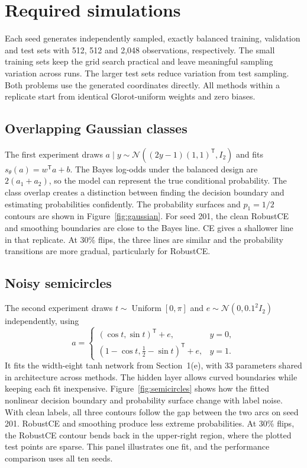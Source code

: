 \documentclass[11pt,a4paper]{article}
\begin{document}
\section{Required simulations}
\label{sec:simulations}
Each seed generates independently sampled, exactly balanced training,
validation and test sets with 512, 512 and 2,048 observations, respectively.
The small training sets keep the grid search practical and leave meaningful
sampling variation across runs. The larger test sets reduce variation from
test sampling. Both problems use the generated coordinates directly. All
methods within a replicate start from identical Glorot-uniform weights and
zero biases.

\subsection{Overlapping Gaussian classes}
The first experiment draws
$a\mid y\sim\mathcal N((2y-1)(1,1)^{\mathsf T},I_2)$ and fits
$s_\theta(a)=w^{\mathsf T}a+b$. The Bayes log-odds under the balanced design
are $2(a_1+a_2)$, so the model can represent the true conditional
probability. The class overlap creates a distinction between finding the
decision boundary and estimating probabilities confidently. The probability
surfaces and $p_1=1/2$ contours are shown in Figure~\ref{fig:gaussian}.
For seed 201, the clean RobustCE and smoothing boundaries are close to
the Bayes line. CE gives a shallower line in that replicate. At 30\%
flips, the three lines are similar and the probability transitions are
more gradual, particularly for RobustCE.

\subsection{Noisy semicircles}
The second experiment draws $t\sim\operatorname{Uniform}[0,\pi]$ and
$e\sim\mathcal N(0,0.1^2I_2)$ independently, using
\begin{equation}
    a=\begin{cases}
        (\cos t,\sin t)^{\mathsf T}+e, & y=0,\\
        (1-\cos t,\tfrac12-\sin t)^{\mathsf T}+e, & y=1.
      \end{cases}
\end{equation}
It fits the width-eight tanh network from Section~1(e), with 33 parameters
shared in architecture across methods. The hidden layer allows curved
boundaries while keeping each fit inexpensive.
Figure~\ref{fig:semicircles} shows how the fitted nonlinear decision
boundary and probability surface change with label noise. With clean
labels, all three contours follow the gap between the two arcs on seed
201. RobustCE and smoothing produce less extreme probabilities. At
30\% flips, the RobustCE contour bends back in the upper-right region,
where the plotted test points are sparse. This panel illustrates one
fit, and the performance comparison uses all ten seeds.
\end{document}
